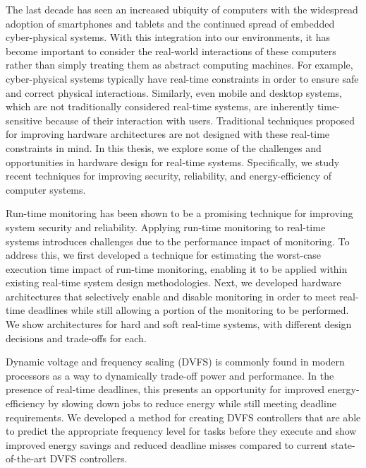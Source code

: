 The last decade has seen an increased ubiquity of computers with the widespread
adoption of smartphones and tablets and the continued spread of embedded
cyber-physical systems. With this integration into our environments, it has
become important to consider the real-world interactions of these computers
rather than simply treating them as abstract computing machines. For example,
cyber-physical systems typically have real-time constraints in order to ensure
safe and correct physical interactions. Similarly, even mobile and desktop
systems, which are not traditionally considered real-time systems, are
inherently time-sensitive because of their interaction with users.  Traditional
techniques proposed for improving hardware architectures are not designed with
these real-time constraints in mind. In this thesis, we explore some of the
challenges and opportunities in hardware design for real-time systems.
Specifically, we study recent techniques for improving security, reliability,
and energy-efficiency of computer systems. 

Run-time monitoring has been shown to be a promising technique for improving
system security and reliability. Applying run-time monitoring to real-time
systems introduces challenges due to the performance impact of monitoring.
To address this, we first developed a technique for estimating the worst-case
execution time impact of run-time monitoring, enabling it to be applied within
existing real-time system design methodologies. Next, we developed hardware
architectures that selectively enable and disable monitoring in order to meet
real-time deadlines while still allowing a portion of the monitoring to be
performed. We show architectures for hard and soft real-time systems, with
different design decisions and trade-offs for each.

Dynamic voltage and frequency scaling (DVFS) is commonly found in modern
processors as a way to dynamically trade-off power and performance.
In the presence of real-time deadlines, this presents an opportunity
for improved energy-efficiency by slowing down jobs to reduce energy while
still meeting deadline requirements. We developed a method for creating DVFS
controllers that are able to predict the appropriate frequency level for tasks
before they execute and show improved energy savings and reduced deadline
misses compared to current state-of-the-art DVFS controllers.

